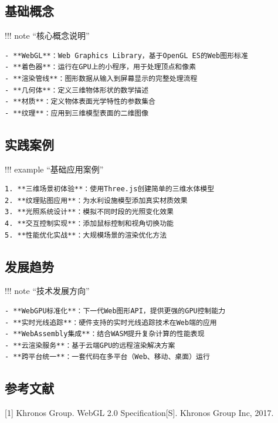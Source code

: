 \subsection{基础概念}\label{ux57faux7840ux6982ux5ff5}

!!! note ``核心概念说明''

\begin{verbatim}
- **WebGL**：Web Graphics Library，基于OpenGL ES的Web图形标准
- **着色器**：运行在GPU上的小程序，用于处理顶点和像素
- **渲染管线**：图形数据从输入到屏幕显示的完整处理流程
- **几何体**：定义三维物体形状的数学描述
- **材质**：定义物体表面光学特性的参数集合
- **纹理**：应用到三维模型表面的二维图像
\end{verbatim}

\subsection{实践案例}\label{ux5b9eux8df5ux6848ux4f8b}

!!! example ``基础应用案例''

\begin{verbatim}
1. **三维场景初体验**：使用Three.js创建简单的三维水体模型
2. **纹理贴图应用**：为水利设施模型添加真实材质效果
3. **光照系统设计**：模拟不同时段的光照变化效果
4. **交互控制实现**：添加鼠标控制和视角切换功能
5. **性能优化实战**：大规模场景的渲染优化方法
\end{verbatim}

\subsection{发展趋势}\label{ux53d1ux5c55ux8d8bux52bf}

!!! note ``技术发展方向''

\begin{verbatim}
- **WebGPU标准化**：下一代Web图形API，提供更强的GPU控制能力
- **实时光线追踪**：硬件支持的实时光线追踪技术在Web端的应用
- **WebAssembly集成**：结合WASM提升复杂计算的性能表现
- **云渲染服务**：基于云端GPU的远程渲染解决方案
- **跨平台统一**：一套代码在多平台（Web、移动、桌面）运行
\end{verbatim}

\subsection{参考文献}\label{ux53c2ux8003ux6587ux732e}

{[}1{]} Khronos Group. WebGL 2.0 Specification{[}S{]}. Khronos Group Inc, 2017.

